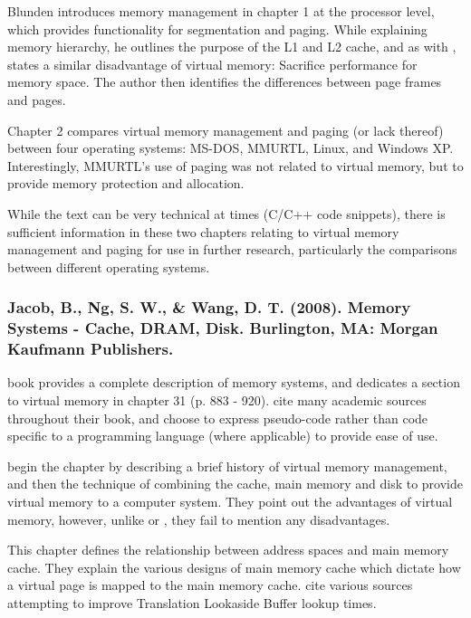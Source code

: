 Blunden introduces memory management in chapter 1 at the processor level, which provides functionality for segmentation and paging. While explaining memory hierarchy, he outlines the purpose of the L1 and L2 cache, and as with \citet{Blanchet2012}, states a similar disadvantage of virtual memory: Sacrifice performance for memory space. The author then identifies the differences between page frames and pages.

Chapter 2 compares virtual memory management and paging (or lack thereof) between four operating systems: MS-DOS, MMURTL, Linux, and Windows XP. Interestingly, MMURTL's use of paging was not related to virtual memory, but to provide memory protection and allocation.

While the text can be very technical at times (C/C++ code snippets), there is sufficient information in these two chapters relating to virtual memory management and paging for use in further research, particularly the comparisons between different operating systems.

\newpage

\subsubsection*{Jacob, B., Ng, S. W., \& Wang, D. T. (2008). Memory Systems - Cache, DRAM, Disk. Burlington, MA: Morgan Kaufmann Publishers.}

 book provides a complete description of memory systems, and dedicates a section to virtual memory in chapter 31 (p. 883 - 920). \citet{Jacob2008} cite many academic sources throughout their book, and choose to express pseudo-code rather than code specific to a programming language (where applicable) to provide ease of use.

\citet{Jacob2008} begin the chapter by describing a brief history of virtual memory management, and then the technique of combining the cache, main memory and disk to provide virtual memory to a computer system. They point out the advantages of virtual memory, however, unlike \citet{Blanchet2012} or \citet{Blunden2003}, they fail to mention any disadvantages.

This chapter defines the relationship between address spaces and main memory cache. They explain the various designs of main memory cache which dictate how a virtual page is mapped to the main memory cache. \citet{Jacob2008} cite various sources attempting to improve Translation Lookaside Buffer lookup times.

